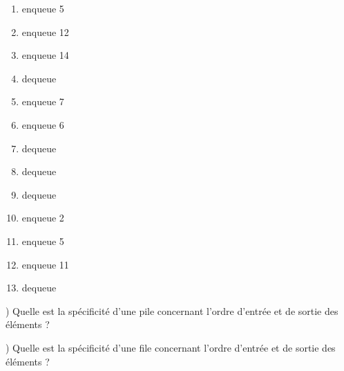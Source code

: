 \documentclass[11pt,a4paper]{article}
\begin{document}
\begin{center}
\begin{table}[ht!]
\begin{minipage}{0.01\textwidth}

  \end{minipage}
  \hfillx
  \begin{minipage}{0.25\textwidth}
    \centering

\begin{enumerate}[label=\roman*]
\item enqueue 5
\item enqueue 12
\item enqueue 14
\item dequeue
\item enqueue 7
\item enqueue 6
\item dequeue
\item dequeue
\end{enumerate}

\vspace*{2cm}

  \end{minipage}
  \hfillx
  \begin{minipage}{0.25\textwidth}
    \centering

\begin{enumerate}[label=\roman*]
\setcounter{enumi}{8}
\item dequeue
\item enqueue 2
\item enqueue 5
\item enqueue 11
\item dequeue
\end{enumerate}

\vspace*{1.75cm}

\vspace*{2cm}

  \end{minipage}
\end{table}



\begin{table}[ht!]
  \centering
  \begin{minipage}{0.5\textwidth}
    ) Quelle est la spécificité d'une pile concernant l'ordre d'entrée et de sortie des éléments ?

  \end{minipage}
  \hfillx
  \begin{minipage}{0.5\textwidth}
    ) Quelle est la spécificité d'une file concernant l'ordre d'entrée et de sortie des éléments ?

  \end{minipage}
\end{table}

\vspace*{1cm}

\end{center}
\end{document}
